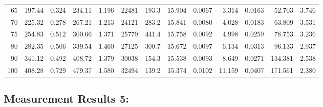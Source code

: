\documentclass[10pt]{article}
\begin{document}
{\begin{tabular}{|r|rr|rr|rr|rr|rr|r|r|}
       65 &       197.44 &        0.324 &       234.11 &        1.196 &        22481 &        193.3 &       15.904 &       0.0067 &        3.314 &       0.0163 &       52.703 &        3.746 \\
       70 &       225.32 &        0.278 &       267.21 &        1.213 &        24121 &        283.2 &       15.841 &       0.0080 &        4.028 &       0.0183 &       63.809 &        3.531 \\
       75 &       254.83 &        0.512 &       300.66 &        1.371 &        25779 &        441.4 &       15.758 &       0.0092 &        4.998 &       0.0259 &       78.753 &        3.236 \\
       80 &       282.35 &        0.506 &       339.54 &        1.460 &        27125 &        300.7 &       15.672 &       0.0097 &        6.134 &       0.0313 &       96.133 &        2.937 \\
       90 &       341.12 &        0.492 &       408.72 &        1.379 &        30038 &        154.3 &       15.538 &       0.0093 &        8.649 &       0.0271 &      134.381 &        2.538 \\
      100 &       408.28 &        0.729 &       479.37 &        1.580 &        32494 &        139.2 &       15.374 &       0.0102 &       11.159 &       0.0407 &      171.561 &        2.380 \\
\hline
\end{tabular}
}



\subsection*{\large \bf Measurement Results 5:}
\end{document}

